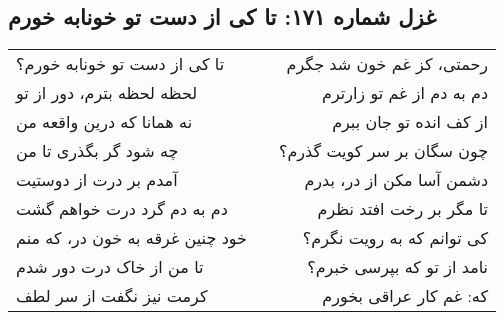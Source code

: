 \begin{center}
\section*{غزل شماره ۱۷۱: تا کی از دست تو خونابه خورم}
\label{sec:171}
\begin{longtable}{l p{0.5cm} r}
تا کی از دست تو خونابه خورم؟
&&
رحمتی، کز غم خون شد جگرم
\\
لحظه لحظه بترم، دور از تو
&&
دم به دم از غم تو زارترم
\\
نه همانا که درین واقعه من
&&
از کف انده تو جان ببرم
\\
چه شود گر بگذری تا من
&&
چون سگان بر سر کویت گذرم؟
\\
آمدم بر درت از دوستیت
&&
دشمن آسا مکن از در، بدرم
\\
دم به دم گرد درت خواهم گشت
&&
تا مگر بر رخت افتد نظرم
\\
خود چنین غرقه به خون در، که منم
&&
کی توانم که به رویت نگرم؟
\\
تا من از خاک درت دور شدم
&&
نامد از تو که بپرسی خبرم؟
\\
کرمت نیز نگفت از سر لطف
&&
که: غم کار عراقی بخورم
\\
\end{longtable}
\end{center}
